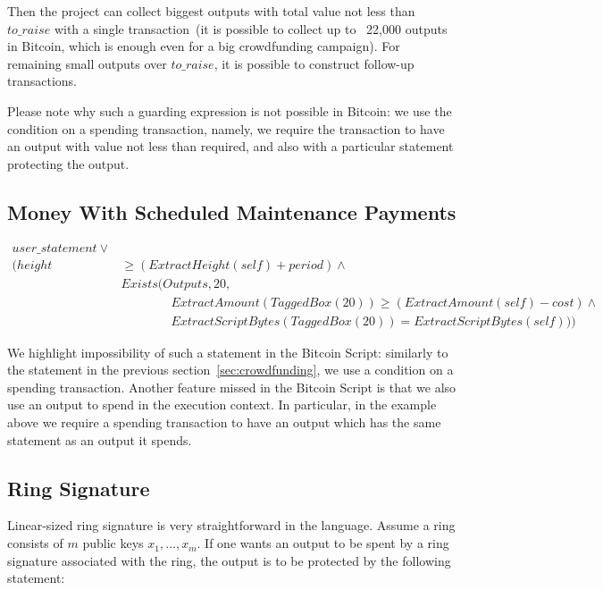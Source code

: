 \documentclass[11pt]{article}
\newcommand{\authnote}[2]{\marginpar{\parbox{\marginparwidth}{\tiny %
  \textsf{#1 {\textcolor{blue}{notes: #2}}}}}%
  \textcolor{blue}{\textbf{\dag}}}
\newcommand{\authnote}[2]{
  \textsf{#1 \textcolor{blue}{: #2}}}
\newcommand{\authnote}[2]{}
\newcommand{\knote}[1]{{\authnote{\textcolor{green}{kushti notes}}{#1}}}
\begin{document}
Then the project can collect biggest outputs with total value not less than $to\_raise$ with a single transaction~(it is possible to collect up to ~22,000 outputs in Bitcoin, which is enough even for a big crowdfunding campaign). For remaining small outputs over $to\_raise$, it is possible to construct follow-up transactions. 

Please note why such a guarding expression is not possible in Bitcoin: we use the condition on a spending transaction, namely, we require the transaction to have an output with value not less than required, and also with a particular statement protecting the output.

\subsection{Money With Scheduled Maintenance Payments}

\knote{description}

\begin{equation*}
\begin{split}
user\_statement \lor \\ 
(height & \ge (ExtractHeight(self) + period) \land \\
    & Exists(Outputs, 20, \\
    & \quad \quad \quad \quad ExtractAmount(TaggedBox(20)) \ge (ExtractAmount(self) - cost) \land \\ 
    & \quad \quad \quad \quad ExtractScriptBytes(TaggedBox(20)) = ExtractScriptBytes(self)))
\end{split}
\end{equation*}

We highlight impossibility of such a statement in the Bitcoin Script: similarly to the statement in the previous section~\ref{sec:crowdfunding}, we use a condition on a spending transaction. Another feature missed in the Bitcoin Script is that we also use an output to spend in the execution context. In particular, in the example above we require a spending transaction to have an output which has the same statement as an output it spends. 

\subsection{Ring Signature}
\label{sec:ring}

Linear-sized ring signature is very straightforward in the language. Assume a ring consists of $m$ public keys $x_1, \dots, x_m$. If one wants an output to be spent by a ring signature associated with the ring, the output is to be protected by the following statement:
\end{document}
